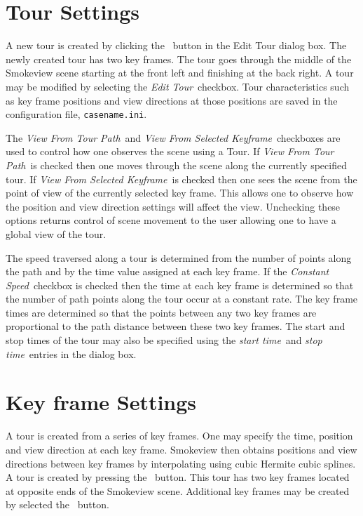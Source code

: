 \documentclass[11pt,twoside]{book}
\newcommand{\frameit}[1]{\fbox{\tt #1}}
\begin{document}
\section{Tour Settings}
A new tour is created
by clicking the \frameit{New Tour}\ button in the Edit Tour dialog box.
The newly created tour has two key frames.  The tour
goes through the middle of the Smokeview scene starting at the
front left and finishing at the back right.
A tour may be modified by selecting the {\em Edit Tour}\ checkbox.
Tour characteristics such as key frame positions and view directions at those positions
are saved in the configuration file, {\tt casename.ini}.

The {\em View From Tour Path}\ and  {\em
View From Selected Keyframe}\ checkboxes are used to control how one observes the
scene using a Tour.  If {\em View From Tour Path}\ is checked then one moves through the
scene along the currently specified tour.  If {\em
View From Selected Keyframe}\ is checked then one sees the scene from the point of view of the
currently selected key frame.  This allows one to observe how
the position and view direction settings will affect the view.  Unchecking these options
returns control of scene movement to the user allowing one to have a global view of the tour.

The speed traversed along a tour is determined from the number of points along the path
and by the time value
assigned at each key frame.   If the {\em Constant Speed}\ checkbox
is checked then the time at each key frame is determined so that
the number of path points along the tour occur at a constant rate.
The key frame times are determined so that the
points between any two key frames are proportional to the path
distance between these two key frames.
The start and stop times of the tour may also be specified using the {\em start time}\ and
{\em stop time}\ entries in the dialog box.


\section{Key frame Settings}
A tour is created from a series of key frames.  One may specify
 the time, position and view direction at each key frame.  Smokeview then
obtains positions and view directions between key frames by interpolating
using cubic Hermite cubic splines.
A tour is created by pressing the
\frameit{Add Tour}\ button.  This tour has two key frames located
at opposite ends of the Smokeview scene.  Additional key frames may
be created by selected the \frameit{Add}\ button.
\end{document}
